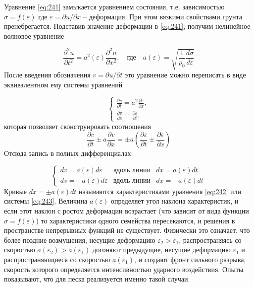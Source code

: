 \documentclass[specialist, subf, href, colorlinks=true, 14pt, final]{disser}
\theoremstyle{definition}
\begin{document}
Уравнение \eqref{eq:241} замыкается уравнением состояния, т.е. зависимостью $\sigma = f(\varepsilon)$ где $\varepsilon = \partial u / \partial x$ -- деформация. При этом вязкими свойствами грунта пренебрегается. Подставив значение деформации в \eqref{eq:241}, получим нелинейное волновое уравнение
\addtocounter{equation}{1}
\begin{equation}\label{eq:242}
	 \frac{\partial^2 u}{\partial t^2} = a^2(\varepsilon) \frac{\partial^2 u}{\partial x^2}, \quad \text{где} \quad a(\varepsilon) = \sqrt{\frac{1}{\rho_0} \frac{ d \sigma}{ d \varepsilon}}
	\tag{2}
\end{equation}
После введения обозначения $ v = \partial u/ \partial t$ это уравнение можно переписать в виде эквивалентном ему системы уравнений
\addtocounter{equation}{1}
\begin{equation}\label{eq:243}
	 \left\{
	 	\begin{array}{l}
	 		\displaystyle \frac{\partial v}{\partial t} = a^2 \displaystyle \frac{\partial \varepsilon}{\partial x}, \\
	 		\displaystyle \frac{\partial v}{\partial x} = \displaystyle \frac{\partial \varepsilon}{\partial t},
	 	\end{array}
	 \right.
	\tag{3}
\end{equation} 
которая позволяет сконструировать соотношения
\[
	 \frac{\partial v}{\partial t} \pm a \frac{\partial v}{\partial x}  = \pm a \left( \frac{\partial \varepsilon}{\partial t} \pm \frac{\partial \varepsilon}{\partial x}  \right)
\]
Отсюда запись в полных дифференциалах:
\addtocounter{equation}{1}
\begin{equation}\label{eq:244}
	\left\{ 
	\begin{array}{lcl}
	 dv = a(\varepsilon) d \varepsilon & \text{вдоль линии} & dx = a(\varepsilon) dt \\
	 dv = - a(\varepsilon) d \varepsilon & \text{вдоль линии} & dx = - a(\varepsilon) dt
	 \end{array}
	 \right.
	\tag{4}
\end{equation} 
Кривые $ dx = \pm a(\varepsilon) dt $ называются характеристиками уравнения \eqref{eq:242} или системы \eqref{eq:243}. Величина $a(\varepsilon)$ определяет угол наклона характеристик, и если этот наклон с ростом деформации возрастает (что зависит от вида функции $\sigma = f(\varepsilon)$) то характеристики одного семейства пересекаются, и решения в пространстве непрерывных функций не существует. Физически это означает, что более поздние возмущения, несущие деформацию $\varepsilon_{2} > \varepsilon_{1}$, распространяясь со скоростью $a(\varepsilon_{2}) > a(\varepsilon_{1})$ догоняют предыдущие, несущие деформацию $\varepsilon_1$ и распространяющиеся со скоростью $a(\varepsilon_{1})$, и создают фронт сильного разрыва, скорость которого определяется интенсивностью ударного воздействия. Опыты показывают, что для песка реализуется именно такой случаи.
\end{document}
